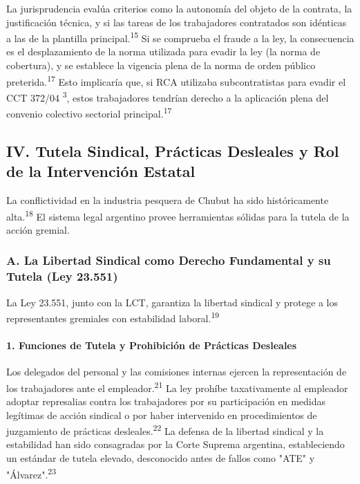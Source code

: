 \documentclass[]{article}
\begin{document}
La jurisprudencia evalúa criterios como la autonomía del objeto de la
contrata, la justificación técnica, y si las tareas de los trabajadores
contratados son idénticas a las de la plantilla
principal.\textsuperscript{15} Si se comprueba el fraude a la ley, la
consecuencia es el desplazamiento de la norma utilizada para evadir la
ley (la norma de cobertura), y se establece la vigencia plena de la
norma de orden público preterida.\textsuperscript{17} Esto implicaría
que, si RCA utilizaba subcontratistas para evadir el CCT 372/04
\textsuperscript{3}, estos trabajadores tendrían derecho a la aplicación
plena del convenio colectivo sectorial principal.\textsuperscript{17}

\hypertarget{iv.-tutela-sindical-pruxe1cticas-desleales-y-rol-de-la-intervenciuxf3n-estatal}{%
\subsection{IV. Tutela Sindical, Prácticas Desleales y Rol de la
Intervención
Estatal}\label{iv.-tutela-sindical-pruxe1cticas-desleales-y-rol-de-la-intervenciuxf3n-estatal}}

La conflictividad en la industria pesquera de Chubut ha sido
históricamente alta.\textsuperscript{18} El sistema legal argentino
provee herramientas sólidas para la tutela de la acción gremial.

\hypertarget{a.-la-libertad-sindical-como-derecho-fundamental-y-su-tutela-ley-23.551}{%
\subsubsection{A. La Libertad Sindical como Derecho Fundamental y su
Tutela (Ley
23.551)}\label{a.-la-libertad-sindical-como-derecho-fundamental-y-su-tutela-ley-23.551}}

La Ley 23.551, junto con la LCT, garantiza la libertad sindical y
protege a los representantes gremiales con estabilidad
laboral.\textsuperscript{19}

\hypertarget{funciones-de-tutela-y-prohibiciuxf3n-de-pruxe1cticas-desleales}{%
\paragraph{1. Funciones de Tutela y Prohibición de Prácticas
Desleales}\label{funciones-de-tutela-y-prohibiciuxf3n-de-pruxe1cticas-desleales}}

Los delegados del personal y las comisiones internas ejercen la
representación de los trabajadores ante el
empleador.\textsuperscript{21} La ley prohíbe taxativamente al empleador
adoptar represalias contra los trabajadores por su participación en
medidas legítimas de acción sindical o por haber intervenido en
procedimientos de juzgamiento de prácticas
desleales.\textsuperscript{22} La defensa de la libertad sindical y la
estabilidad han sido consagradas por la Corte Suprema argentina,
estableciendo un estándar de tutela elevado, desconocido antes de fallos
como "ATE" y "Álvarez".\textsuperscript{23}
\end{document}
